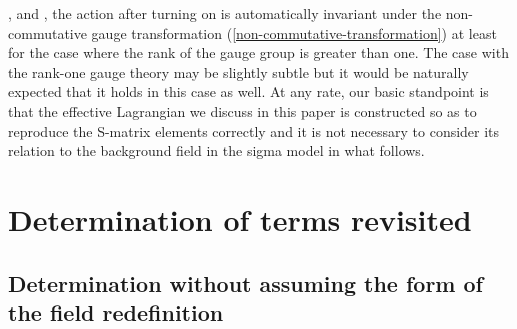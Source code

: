 \documentclass[a4paper,12pt]{article}
\begin{document}
\coordHE{}, \coordHE{} and \coordHE{},
the action after turning on \coordHE{} is automatically invariant
under the non-commutative gauge transformation
(\ref{non-commutative-transformation})
at least for the case where
the rank of the gauge group is greater than one.
The case with the rank-one gauge theory may be slightly subtle
but it would be naturally expected that
it holds in this case as well.
At any rate, our basic standpoint is that
the effective Lagrangian we discuss in this paper is
constructed so as to reproduce the S-matrix elements correctly
and it is not necessary to consider its relation
to the background field in the sigma model in what follows.

\section{Determination of \coordHE{} terms revisited}
\setcounter{equation}{0}

\subsection{Determination without assuming
the form of the field redefinition}
\indent
\end{document}
